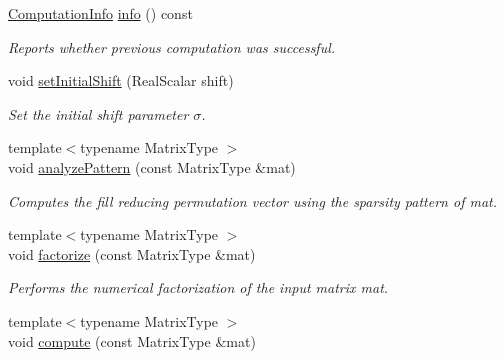 \begin{DoxyCompactItemize}
\hyperlink{group__enums_ga85fad7b87587764e5cf6b513a9e0ee5e}{Computation\+Info} \hyperlink{class_eigen_1_1_incomplete_cholesky_ada0e68cb22601849464506f5986a88c1}{info} () const
\begin{DoxyCompactList}\small\item\em Reports whether previous computation was successful. \end{DoxyCompactList}\item 
\mbox{\label{class_eigen_1_1_incomplete_cholesky_a409c9586e7d29566dda2c8f5e38a1228}} 
void \hyperlink{class_eigen_1_1_incomplete_cholesky_a409c9586e7d29566dda2c8f5e38a1228}{set\+Initial\+Shift} (Real\+Scalar shift)
\begin{DoxyCompactList}\small\item\em Set the initial shift parameter $ \sigma $. \end{DoxyCompactList}\item 
\mbox{\label{class_eigen_1_1_incomplete_cholesky_a702560ecdddef77dc51d20ab22bd974e}} 
{\footnotesize template$<$typename Matrix\+Type $>$ }\\void \hyperlink{class_eigen_1_1_incomplete_cholesky_a702560ecdddef77dc51d20ab22bd974e}{analyze\+Pattern} (const Matrix\+Type \&mat)
\begin{DoxyCompactList}\small\item\em Computes the fill reducing permutation vector using the sparsity pattern of {\itshape mat}. \end{DoxyCompactList}\item 
{\footnotesize template$<$typename Matrix\+Type $>$ }\\void \hyperlink{class_eigen_1_1_incomplete_cholesky_ac39c75ff7ca5d2db9a9f03b937e12601}{factorize} (const Matrix\+Type \&mat)
\begin{DoxyCompactList}\small\item\em Performs the numerical factorization of the input matrix {\itshape mat}. \end{DoxyCompactList}\item 
{\footnotesize template$<$typename Matrix\+Type $>$ }\\void \hyperlink{class_eigen_1_1_incomplete_cholesky_a7966bedeebbeaa7a8fe4dd1da3797a0b}{compute} (const Matrix\+Type \&mat)
\item 
\mbox{\label{class_eigen_1_1_incomplete_cholesky_a7df2a13e73f1ac4a2fc7a6524bd93f84}} 

\end{DoxyCompactItemize}
